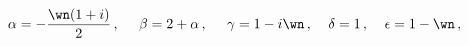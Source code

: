 \begin{equation}
\alpha  = -{\wn (1+i)\over 2}\,,\;\;\; \;\; \beta = 2 +\alpha\,,
\;\;\; \;\; \gamma = 1 - i \wn \,,\;\;\;\; \delta = 1\,, 
\;\;\;\; \epsilon = 1- \wn\,, 
\label{vector_param}
\end{equation}

